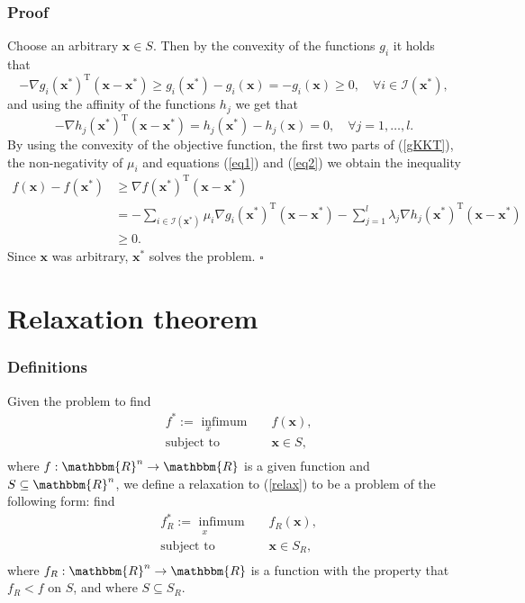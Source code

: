 \documentclass[12pt, a4paper]{article}
\begin{document}
\subsubsection*{Proof}
Choose an arbitrary $\bm{x}\in S$. Then by the convexity of the functions $g_i$ it holds that
\begin{equation}
\label{eq1}
    -\nabla g_i(\bm{x}^*)^{\text{T}}(\bm{x}-\bm{x}^*)\geq g_i(\bm{x}^*) - g_i(\bm{x}) = -g_i(\bm{x}) \geq 0, \quad \forall i \in\mathcal{I}(\bm{x}^*),
\end{equation}
and using the affinity of the functions $h_j$ we get that
\begin{equation}
\label{eq2}
-\nabla h_j(\bm{x}^*)^{\text{T}}(\bm{x}-\bm{x}^*) = h_j(\bm{x}^*) - h_j(\bm{x}) = 0, \quad \forall j = 1,\dots,l.
\end{equation}
By using the convexity of the objective function, the first two parts of (\ref{gKKT}), the non-negativity of $\mu_i$ and equations (\ref{eq1}) and (\ref{eq2}) we obtain the inequality
\begin{equation*}
\begin{split}
f(\bm{x}) -f(\bm{x}^*) &\geq \nabla f(\bm{x}^*)^{\text{T}}(\bm{x}-\bm{x}^*)\\
&=-\sum_{i\in\mathcal{I}(\bm{x}^*)} \mu_i \nabla g_i(\bm{x}^*)^{\text{T}}(\bm{x}-\bm{x}^*) - \sum_{j=1}^l \lambda_j \nabla h_j(\bm{x}^*)^{\text{T}}(\bm{x}-\bm{x}^*)\\
&\geq 0.
\end{split}
\end{equation*}
Since $\bm{x}$ was arbitrary, $\bm{x}^*$ solves the problem. $\square$

\section{Relaxation theorem}
\subsubsection*{Definitions}
Given the problem to find
\begin{equation}
\label{relax}
\begin{aligned}
& \underset{x}{f^* := \text{ infimum }}
& & f(\bm{x}), \\
& \text{subject to}
& & \bm{x}\in S,\\
\end{aligned}
\end{equation}
where $f:\mathbbm{R}^n \rightarrow \mathbbm{R}$ is a given function and $S\subseteq\mathbbm{R}^n$, we define a relaxation to (\ref{relax}) to be a problem of the following form: find
\begin{equation}
\label{relax2}
\begin{aligned}
& \underset{x}{f_{R}^* := \text{ infimum }}
& & f_R(\bm{x}), \\
& \text{subject to}
& & \bm{x}\in S_R,\\
\end{aligned}
\end{equation}
where $f_R : \mathbbm{R}^n \rightarrow \mathbbm{R}$ is a function with the property that $f_R<f$ on $S$, and where $S\subseteq S_R$.
\end{document}
